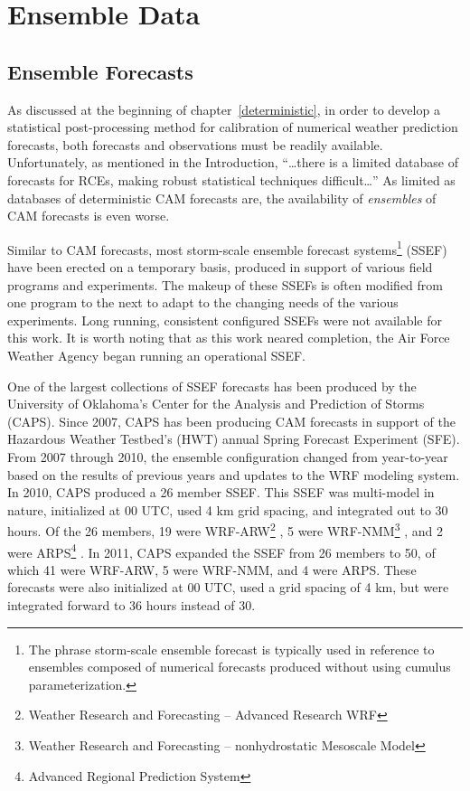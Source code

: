 

\section{Ensemble Data}
\label{edata}




\subsection{Ensemble Forecasts}
\label{emodel}

As discussed at the beginning of \mbox{chapter \ref{deterministic}}, in order to develop a statistical post-processing method for calibration of numerical weather prediction forecasts, both forecasts and observations must be readily available.
Unfortunately, as mentioned in the Introduction, ``\dots there is a limited database of forecasts for RCEs, making robust statistical techniques difficult\dots''
As limited as databases of deterministic CAM forecasts are, the availability of \emph{ensembles} of CAM forecasts is even worse.


Similar to CAM forecasts, most storm-scale ensemble forecast systems\footnote{The phrase storm-scale ensemble forecast is typically used in reference to ensembles composed of numerical forecasts produced without using cumulus parameterization.} (SSEF) have been erected on a temporary basis, produced in support of various field programs and experiments.
The makeup of these SSEFs is often modified from one program to the next to adapt to the changing needs of the various experiments.
Long running, consistent configured SSEFs were not available for this work.
It is worth noting that as this work neared completion, the Air Force Weather Agency began running an operational SSEF.


One of the largest collections of SSEF forecasts has been produced by the University of Oklahoma's Center for the Analysis and Prediction of Storms (CAPS).
Since 2007, CAPS has been producing CAM forecasts in support of the Hazardous Weather Testbed's (HWT) annual Spring Forecast Experiment (SFE).
From 2007 through 2010, the ensemble configuration changed from year-to-year based on the results of previous years and updates to the WRF modeling system.
In 2010, CAPS produced a 26 member SSEF.
This SSEF was multi-model in nature, initialized at 00 UTC, used 4 km grid spacing, and integrated out to 30 hours.
Of the 26 members, 19 were WRF-ARW\footnote{Weather Research and Forecasting -- Advanced Research WRF} \citep{WRFV3}, 5 were WRF-NMM\footnote{Weather Research and Forecasting -- nonhydrostatic Mesoscale Model} \citep{NAMnWRF-NMM}, and 2 were ARPS\footnote{Advanced Regional Prediction System} \citep{ARPS}.
In 2011, CAPS expanded the SSEF from 26 members to 50, of which 41 were WRF-ARW, 5 were WRF-NMM, and 4 were ARPS.
These forecasts were also initialized at 00 UTC, used a grid spacing of 4 km, but were integrated forward to 36 hours instead of 30.


